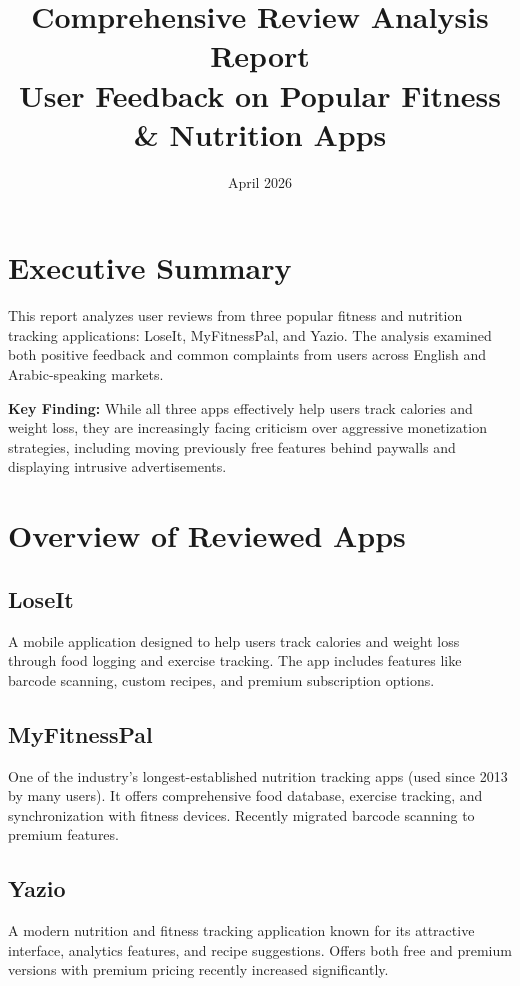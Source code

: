 \documentclass[12pt, a4paper]{article}
\title{\textbf{Comprehensive Review Analysis Report}\\
\large User Feedback on Popular Fitness \& Nutrition Apps}
\author{}
\date{April 2026}
\begin{document}
\maketitle

\section*{Executive Summary}

This report analyzes user reviews from three popular fitness and nutrition tracking applications: LoseIt, MyFitnessPal, and Yazio. The analysis examined both positive feedback and common complaints from users across English and Arabic-speaking markets.

\textbf{Key Finding:} While all three apps effectively help users track calories and weight loss, they are increasingly facing criticism over aggressive monetization strategies, including moving previously free features behind paywalls and displaying intrusive advertisements.

\vspace{0.5cm}

\section{Overview of Reviewed Apps}

\subsection{LoseIt}
A mobile application designed to help users track calories and weight loss through food logging and exercise tracking. The app includes features like barcode scanning, custom recipes, and premium subscription options.

\subsection{MyFitnessPal}
One of the industry's longest-established nutrition tracking apps (used since 2013 by many users). It offers comprehensive food database, exercise tracking, and synchronization with fitness devices. Recently migrated barcode scanning to premium features.

\subsection{Yazio}
A modern nutrition and fitness tracking application known for its attractive interface, analytics features, and recipe suggestions. Offers both free and premium versions with premium pricing recently increased significantly.
\end{document}
